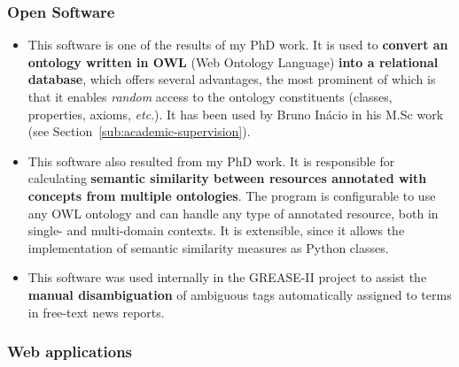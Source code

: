 \subsubsection{Open Software}

\begin{itemize}
    \item This software is one of the results of my PhD work. It is used to \textbf{convert an ontology written in OWL} (Web Ontology Language) \textbf{into a relational database}, which offers several advantages, the most prominent of which is that it enables \emph{random} access to the ontology constituents (classes, properties, axioms, \emph{etc}.). It has been used by Bruno Inácio in his M.Sc work (see Section~\ref{sub:academic-supervision}).
\end{itemize}


\begin{itemize}
    \item This software also resulted from my PhD work. It is responsible for calculating \textbf{semantic similarity between resources annotated with concepts from multiple ontologies}. The program is configurable to use any OWL ontology and can handle any type of annotated resource, both in single- and multi-domain contexts. It is extensible, since it allows the implementation of semantic similarity measures as Python classes.
\end{itemize}

\begin{itemize}
    \item This software was used internally in the GREASE-II project to assist the \textbf{manual disambiguation} of ambiguous tags automatically assigned to terms in free-text news reports.
\end{itemize}


\subsubsection{Web applications}

